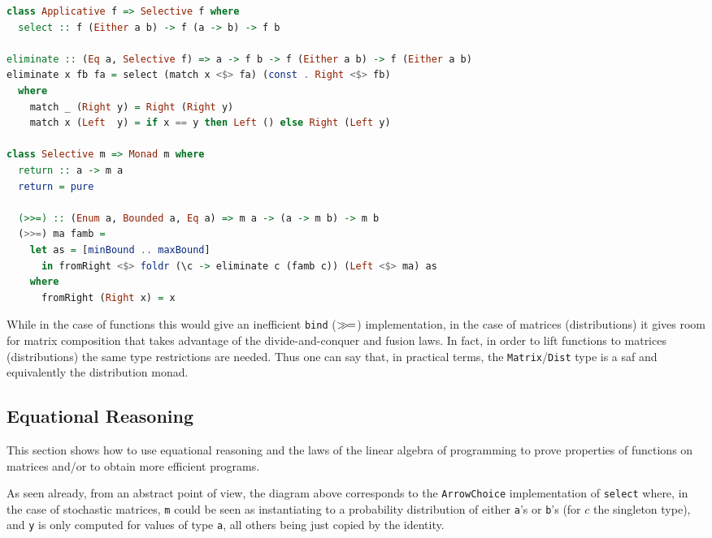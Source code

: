\documentclass[
  oneside,
  11pt, a4paper,
  footinclude=true,
  headinclude=true,
  cleardoublepage=empty
]{scrbook}
\theoremstyle{definition}
\theoremstyle{definition}
\def\bind{\mathbin{{>\hskip-1ex>\hskip-.4ex=}}}
\begin{document}
        \begin{lstlisting}[language=Haskell, caption={Constrainted monad instance},captionpos=b]
class Applicative f => Selective f where
  select :: f (Either a b) -> f (a -> b) -> f b

eliminate :: (Eq a, Selective f) => a -> f b -> f (Either a b) -> f (Either a b)
eliminate x fb fa = select (match x <$> fa) (const . Right <$> fb)
  where
    match _ (Right y) = Right (Right y)
    match x (Left  y) = if x == y then Left () else Right (Left y)

class Selective m => Monad m where
  return :: a -> m a
  return = pure

  (>>=) :: (Enum a, Bounded a, Eq a) => m a -> (a -> m b) -> m b
  (>>=) ma famb =
    let as = [minBound .. maxBound]
      in fromRight <$> foldr (\c -> eliminate c (famb c)) (Left <$> ma) as
    where
      fromRight (Right x) = x
        \end{lstlisting}{}
        
        While in the case of functions this would give an inefficient \texttt{bind} ($\bind$) implementation, in the case of matrices (distributions) it gives room for matrix composition that takes advantage of the divide-and-conquer and fusion laws. In fact, in order to lift functions to matrices (distributions) the same type restrictions are needed. Thus one can say that, in practical terms, the \texttt{Matrix}/\texttt{Dist} type is a \gls{saf} and equivalently the distribution monad.
        
        \subsection{Equational Reasoning} \label{sec-eq-reason}
        
        This section shows how to use equational reasoning and the laws of the linear algebra of programming to prove properties of functions on matrices and/or to obtain more efficient programs.
        
        \begin{figure}[h]%
        \centering
        \end{figure}
        As seen already, from an abstract point of view, the diagram above corresponds to the \texttt{ArrowChoice} implementation of \texttt{select} where, in the case of stochastic matrices, \texttt{m} could be seen as instantiating to a probability distribution of either \texttt{a}'s or \texttt{b}'s (for $c$ the singleton type), and \texttt{y} is only computed for values of type \texttt{a}, all others being just copied by the identity.
        
\end{document}
